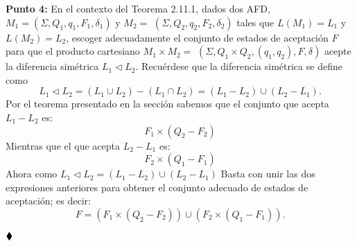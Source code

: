 \textbf{Punto 4: }En el contexto del Teorema 2.11.1, dados dos AFD, $M_1=\left(\Sigma, Q_1, q_1, F_1, \delta_1\right)$ y $M_2=$ $\left(\Sigma, Q_2, q_2, F_2, \delta_2\right)$ tales que $L\left(M_1\right)=L_1$ y $L\left(M_2\right)=L_2$, escoger adecuadamente el conjunto de estados de aceptación $F$ para que el producto cartesiano $M_1 \times M_2=$ $\left(\Sigma, Q_1 \times Q_2,\left(q_1, q_2\right), F, \delta\right)$ acepte la diferencia simétrica $L_1 \triangleleft L_2$. Recuérdese que la diferencia simétrica se define como
$$
L_1 \triangleleft L_2=\left(L_1 \cup L_2\right)-\left(L_1 \cap L_2\right)=\left(L_1-L_2\right) \cup\left(L_2-L_1\right) .
$$
Por el teorema presentado en la sección sabemos que el conjunto que acepta $L_1-L_2$ es:
$$F_1\times(Q_2-F_2)$$
Mientras que el que acepta $L_2-L_1$ es:
$$F_2\times(Q_1-F_1)$$
Ahora como $L_1\triangleleft L_2=(L_1-L_2)\cup(L_2-L_1)$ Basta con unir las dos expresiones anteriores para obtener el conjunto adecuado de estados de aceptación; es decir:
$$F=(F_1\times(Q_2-F_2))\cup(F_2\times(Q_1-F_1)).$$

$\hfill \blacklozenge$